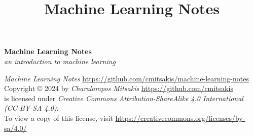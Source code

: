 \documentclass{article}
\title{Machine Learning Notes}
\begin{document}
\vspace*{2cm}
\begin{center}
	\Huge\textbf{Machine Learning Notes}\\
	\LARGE\textit{an introduction to machine learning}
\end{center}
\vspace*{2cm}

\textit{Machine Learning Notes} \url{https://github.com/cmitsakis/machine-learning-notes} \\
Copyright © 2024 by \textit{Charalampos Mitsakis} \url{https://github.com/cmitsakis} \\
is licensed under \textit{Creative Commons Attribution-ShareAlike 4.0 International (CC-BY-SA 4.0)}. \\
To view a copy of this license, visit \url{https://creativecommons.org/licenses/by-sa/4.0/}
\end{document}
